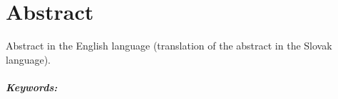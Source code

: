\documentclass[12pt, twoside]{book}
\begin{document}
\newpage 
\thispagestyle{empty}
\chapter*{Abstract}\label{chap:abstract_en}
Abstract in the English language (translation of the abstract in the
Slovak language).

\paragraph*{Keywords:} 

%
%
%
%



\newpage 

\tableofcontents



\newpage 

\listoffigures
\listoftables


\mainmatter
\pagestyle{headings}

 






%



\newpage	

\backmatter

\thispagestyle{empty}
\clearpage
\end{document}
